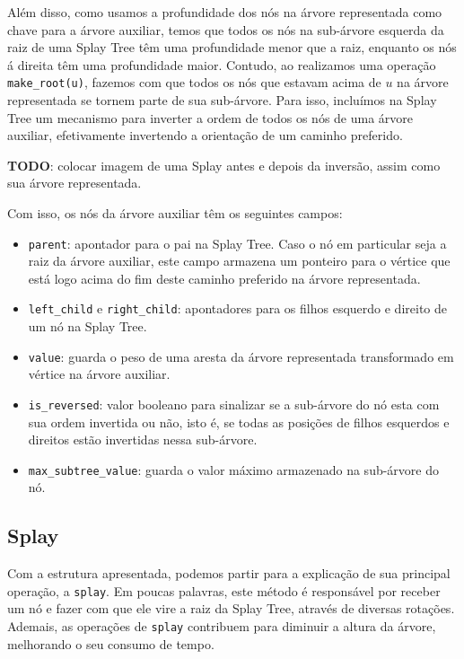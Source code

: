 Além disso, como usamos a profundidade dos nós na árvore representada como chave para a árvore auxiliar, temos que todos os nós na sub-árvore esquerda da raiz de uma Splay Tree têm uma profundidade menor que a raiz, enquanto os nós á direita têm uma profundidade maior. Contudo, ao realizamos uma operação \texttt{make\_root(u)}, fazemos com que todos os nós que estavam acima de $u$ na árvore representada se tornem parte de sua sub-árvore. Para isso, incluímos na Splay Tree um mecanismo para inverter a ordem de todos os nós de uma árvore auxiliar, efetivamente invertendo a orientação de um caminho preferido.

\begin{center}
    \textbf{TODO}: colocar imagem de uma Splay antes e depois da inversão, assim como sua árvore representada.
\end{center}

Com isso, os nós da árvore auxiliar têm os seguintes campos:

\begin{itemize}
    \item \texttt{parent}: apontador para o pai na Splay Tree. Caso o nó em particular seja a raiz da árvore auxiliar, este campo armazena um ponteiro para o vértice que está logo acima do fim deste caminho preferido na árvore representada.
    \item \texttt{left\_child} e \texttt{right\_child}: apontadores para os filhos esquerdo e direito de um nó na Splay Tree.
    \item \texttt{value}: guarda o peso de uma aresta da árvore representada transformado em vértice na árvore auxiliar.
    \item \texttt{is\_reversed}: valor booleano para sinalizar se a sub-árvore do nó esta com sua ordem invertida ou não, isto é, se todas as posições de filhos esquerdos e direitos estão  invertidas nessa  sub-árvore.
    \item \texttt{max\_subtree\_value}: guarda o valor máximo armazenado na sub-árvore do nó.
\end{itemize}

\subsection{Splay}
\label{subsection:lct-splay-splay}

Com a estrutura apresentada, podemos partir para a explicação de sua principal operação, a \texttt{splay}. Em poucas palavras, este método é responsável por receber um nó e fazer com que ele vire a raiz da Splay Tree, através de diversas rotações.  Ademais, as operações de \texttt{splay} contribuem para diminuir a altura da árvore, melhorando o seu consumo de tempo.

